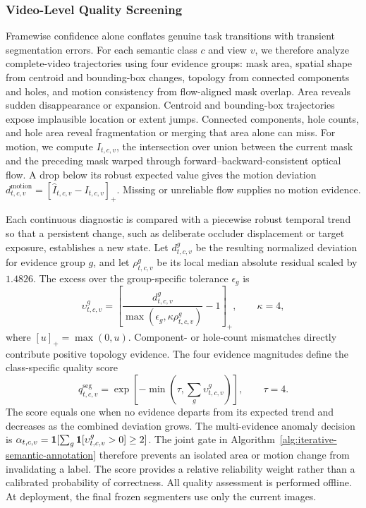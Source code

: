 \subsubsection{Video-Level Quality Screening}
Framewise confidence alone conflates genuine task transitions with transient segmentation errors.
For each semantic class $c$ and view $v$, we therefore analyze complete-video trajectories using four evidence groups:
mask area, spatial shape from centroid and bounding-box changes, topology from connected components and holes, and motion consistency from flow-aligned mask overlap.
Area reveals sudden disappearance or expansion.
Centroid and bounding-box trajectories expose implausible location or extent jumps.
Connected components, hole counts, and hole area reveal fragmentation or merging that area alone can miss.
For motion, we compute $I_{t,c,v}$, the intersection over union between the current mask and the preceding mask warped through forward--backward-consistent optical flow.
A drop below its robust expected value gives the motion deviation $d_{t,c,v}^{\mathrm{motion}}=[\widehat I_{t,c,v}-I_{t,c,v}]_+$.
Missing or unreliable flow supplies no motion evidence.

Each continuous diagnostic is compared with a piecewise robust temporal trend so that a persistent change, such as deliberate occluder displacement or target exposure, establishes a new state.
Let $d_{t,c,v}^{g}$ be the resulting normalized deviation for evidence group $g$, and let $\rho_{t,c,v}^{g}$ be its local median absolute residual scaled by $1.4826$.
The excess over the group-specific tolerance $\epsilon_g$ is
\begin{equation}
 \upsilon_{t,c,v}^{g}
 =\left[
 \frac{d_{t,c,v}^{g}}
 {\max(\epsilon_g,\kappa\rho_{t,c,v}^{g})}-1
 \right]_+,
 \qquad \kappa=4,
 \label{eq:qualityevidence}
\end{equation}
where $[u]_+=\max(0,u)$.
Component- or hole-count mismatches directly contribute positive topology evidence.
The four evidence magnitudes define the class-specific quality score
\begin{equation}
 q_{t,c,v}^{\mathrm{seg}}
 =\exp\!\left[-\min\!\left(\tau,
 \sum_g\upsilon_{t,c,v}^{g}\right)\right],
 \qquad \tau=4.
 \label{eq:segquality}
\end{equation}
The score equals one when no evidence departs from its expected trend and decreases as the combined deviation grows.
The multi-evidence anomaly decision is $\alpha_{t,c,v}=\mathbf 1[\sum_g\mathbf 1[\upsilon_{t,c,v}^{g}>0]\ge2]$.
The joint gate in Algorithm~\ref{alg:iterative-semantic-annotation} therefore prevents an isolated area or motion change from invalidating a label.
The score provides a relative reliability weight rather than a calibrated probability of correctness.
All quality assessment is performed offline.
At deployment, the final frozen segmenters use only the current images.

